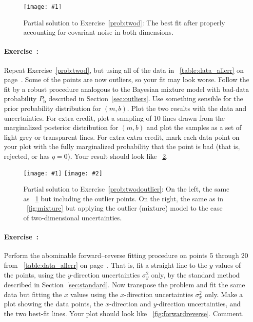 \documentclass[12pt,twoside]{article}
\newcommand{\exampleplot}[1]{%
\begin{center}%
\texttt{[image: \#1]}%
\end{center}%
}
\newcommand{\exampleplottwo}[2]{%
\begin{center}%
\texttt{[image: \#1]}%
\texttt{[image: \#2]}%
\end{center}%
}
\newcommand{\sectionname}{Section}
\newcommand{\problemname}{Exercise}
\newcounter{problem}
\newenvironment{problem}{\paragraph{\problemname~\theproblem:}\refstepcounter{problem}}{}
\newcommand{\Pbad}{P_{\mathrm{b}}}
\begin{document}
\begin{figure}[htbp]
\exampleplot{ex12}
\caption{Partial solution to \problemname~\ref{prob:twod}: The best
fit after properly accounting for covariant noise in both
dimensions.}\label{fig:twod}
\end{figure}

\begin{problem}\label{prob:twodoutlier}
Repeat \problemname~\ref{prob:twod}, but using all of the data in
\tablename~\ref{table:data_allerr} on
page~\pageref{table:data_allerr}.  Some of the points are now
outliers, so your fit may look worse.  Follow the fit by a robust
procedure analogous to the Bayesian mixture model with bad-data
probability $\Pbad$ described in \sectionname~\ref{sec:outliers}.  Use
something sensible for the prior probability distribution for $(m,b)$.
Plot the two results with the data and uncertainties.  For extra
credit, plot a sampling of 10 lines drawn from the marginalized
posterior distribution for $(m,b)$ and plot the samples as a set of
light grey or transparent lines.  For extra extra credit, mark each
data point on your plot with the fully marginalized probability that
the point is bad (that is, rejected, or has $q=0$).  Your result
should look like \figurename~\ref{fig:twodoutlier}.
\end{problem}

\begin{figure}[htbp]
\exampleplottwo{ex13a}{ex13b}
\caption{Partial solution to \problemname~\ref{prob:twodoutlier}: On
the left, the same as \figurename~\ref{fig:twod} but including the
outlier points.  On the right, the same as in
\figurename~\ref{fig:mixture} but applying the outlier (mixture) model
to the case of two-dimensional uncertainties.}\label{fig:twodoutlier}
\end{figure}

\begin{problem}\label{prob:forwardreverse}
Perform the abominable forward--reverse fitting procedure on points 5
through 20 from \tablename~\ref{table:data_allerr} on
page~\pageref{table:data_allerr}.  That is, fit a straight line to the
$y$ values of the points, using the $y$-direction uncertainties
$\sigma_y^2$ only, by the standard method described in
\sectionname~\ref{sec:standard}.  Now transpose the problem and fit
the same data but fitting the $x$ values using the $x$-direction
uncertainties $\sigma_x^2$ only.  Make a plot showing the data points,
the $x$-direction and $y$-direction uncertainties, and the two
best-fit lines.  Your plot should look like
\figurename~\ref{fig:forwardreverse}.  Comment.
\end{problem}
\end{document}
